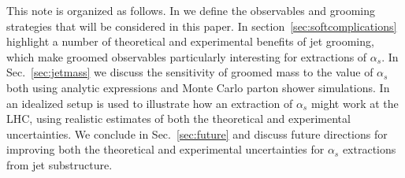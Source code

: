 This note is organized as follows. In  we define the observables and grooming strategies that will be considered in this paper. In section~\ref{sec:softcomplications} highlight a number of theoretical and experimental benefits of jet grooming, which make groomed observables particularly interesting for extractions of $\alpha_s$. In Sec.~\ref{sec:jetmass} we discuss the sensitivity of groomed mass to the value of $\alpha_s$ both using analytic expressions and Monte Carlo parton shower simulations.   In  an idealized setup is used to illustrate how an extraction of $\alpha_s$ might work at the LHC, using realistic estimates of both the theoretical and experimental uncertainties.  We conclude in Sec.~\ref{sec:future} and discuss future directions for improving both the theoretical and experimental uncertainties for $\alpha_s$ extractions from jet substructure.

\begin{comment}
\begin{itemize}
\item Laying the groundwork for high precision ($\mathcal{O}(1\%)$) extractions of $\alpha_s$ for the full LHC dataset or a future $e^+e^-$ machine.
\item Competitive measurements with existing LHC extractions of $\alpha_s$ (5\%)
\item Probing the tension between thrust (and friends) extractions with lattice (10\%)
\item Parton shower MC (15\%)
\end{itemize}
\end{comment}







